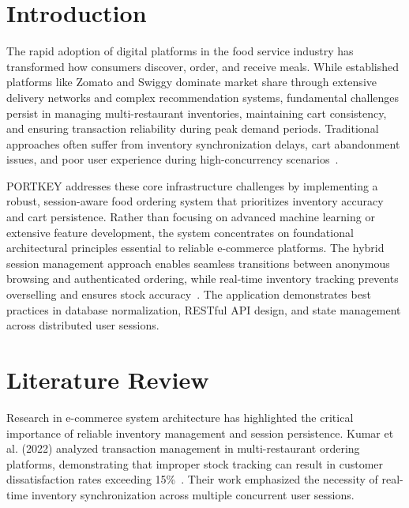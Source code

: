 \documentclass{ieeeaccess}
\begin{document}
\titlepgskip=-15pt
\maketitle

\renewcommand{\IEEEPARstart}[2]{#1#2}

\section{Introduction}
\label{sec:intro}
The rapid adoption of digital platforms in the food service industry has transformed how consumers discover, order, and receive meals. While established platforms like Zomato and Swiggy dominate market share through extensive delivery networks and complex recommendation systems, fundamental challenges persist in managing multi-restaurant inventories, maintaining cart consistency, and ensuring transaction reliability during peak demand periods. Traditional approaches often suffer from inventory synchronization delays, cart abandonment issues, and poor user experience during high-concurrency scenarios~\cite{b1}.

PORTKEY addresses these core infrastructure challenges by implementing a robust, session-aware food ordering system that prioritizes inventory accuracy and cart persistence. Rather than focusing on advanced machine learning or extensive feature development, the system concentrates on foundational architectural principles essential to reliable e-commerce platforms. The hybrid session management approach enables seamless transitions between anonymous browsing and authenticated ordering, while real-time inventory tracking prevents overselling and ensures stock accuracy~\cite{b2}. The application demonstrates best practices in database normalization, RESTful API design, and state management across distributed user sessions.

\section{Literature Review}
\label{sec:lit}
Research in e-commerce system architecture has highlighted the critical importance of reliable inventory management and session persistence. Kumar et al. (2022) analyzed transaction management in multi-restaurant ordering platforms, demonstrating that improper stock tracking can result in customer dissatisfaction rates exceeding 15\%~\cite{b3}. Their work emphasized the necessity of real-time inventory synchronization across multiple concurrent user sessions.
\end{document}
